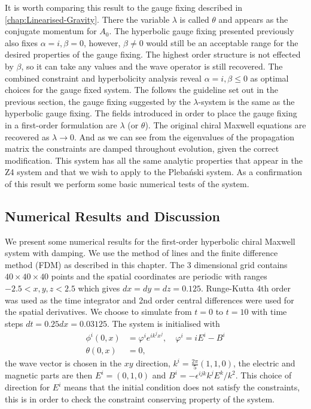 \documentclass[10pt]{report}
\newcommand{\pleb}[0]{Pleba\'nski}
\theoremstyle{definition}
\begin{document}
It is worth comparing this result to the gauge fixing described in \cref{chap:Linearised-Gravity}. There the variable $\lambda$ is called $\theta$ and appears as the conjugate momentum for $A_0$. The hyperbolic gauge fixing presented previously also fixes $\alpha = i, \beta = 0$, however, $\beta \neq 0$ would still be an acceptable range for the desired properties of the gauge fixing. The highest order structure is not effected by $\beta$, so it can take any values and the wave operator is still recovered. The combined constraint and hyperbolicity analysis reveal $\alpha = i, \beta \leq 0$ as optimal choices for the gauge fixed system. The follows the guideline set out in the previous section, the gauge fixing suggested by the $\lambda$-system is the same as the hyperbolic gauge fixing. The fields introduced in order to place the gauge fixing in a first-order formulation are $\lambda$ (or $\theta$). The original chiral Maxwell equations are recovered as $\lambda \rightarrow 0$. And as we can see from the eigenvalues of the propagation matrix the constraints are damped throughout evolution, given the correct modification. This system has all the same analytic properties that appear in the Z4 system and that we wish to apply to the \pleb{} system. As a confirmation of this result we perform some basic numerical tests of the system.

\subsection{Numerical Results and Discussion}
We present some numerical results for the first-order hyperbolic chiral Maxwell system with damping. We use the method of lines and the finite difference method (FDM) as described in this chapter. The 3 dimensional grid contains $40\times 40\times 40$ points and the spatial coordinates are periodic with ranges $-2.5 <  x,y,z <  2.5$ which gives $dx=dy=dz=0.125$. Runge-Kutta 4th order was used as the time integrator and 2nd order central differences were used for the spatial derivatives. We choose to simulate from $t = 0$ to $t = 10$ with time steps $dt = 0.25 dx = 0.03125$. The system is initialised with
\begin{align}
    \phi^i(0,x) &= \varphi^i e^{i k^j x^j}, \quad \varphi^i = i E^i - B^i \\ 
    \theta(0,x) &= 0,
\end{align}
the wave vector is chosen in the $xy$ direction, $k^i = \frac{2\pi}{5} (1,1,0)$, the electric and magnetic parts are then $E^i = (0,1,0)$ and $B^i = -\epsilon^{ijk} k^j E^k/k^2$. This choice of direction for $E^i$ means that the initial condition does not satisfy the constraints, this is in order to check the constraint conserving property of the system.
\end{document}
